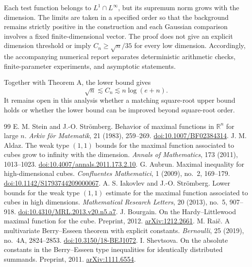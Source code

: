\documentclass[a4paper,11pt]{article}
\theoremstyle{remark}
\begin{document}
Each test function belongs to $L^1\cap L^\infty$, but its supremum norm grows with the dimension.
The limits are taken in a specified order so that the background remains strictly positive in the construction
and each Gaussian comparison involves a fixed finite-dimensional vector. The proof does not give an explicit dimension threshold or imply
$C_n\ge\sqrt n/35$ for every low dimension. Accordingly, the accompanying numerical report separates deterministic arithmetic checks, finite-parameter experiments, and
asymptotic statements.

Together with Theorem A, the lower bound gives
\[
 \sqrt n\lesssim C_n\lesssim n\log(e+n).
\]
It remains open in this analysis whether a matching square-root upper bound holds or whether the lower bound can be improved beyond square-root order.

\begin{thebibliography}{99}
 E. M. Stein and J.-O. Strömberg.
Behavior of maximal functions in $\mathbb R^n$ for large $n$.
\emph{Arkiv för Matematik}, 21 (1983), 259--269.
\href{https://doi.org/10.1007/BF02384314}{doi:10.1007/BF02384314}.
 J. M. Aldaz.
The weak type $(1,1)$ bounds for the maximal function associated to cubes grow to infinity with the dimension.
\emph{Annals of Mathematics}, 173 (2011), 1013--1023.
\href{https://doi.org/10.4007/annals.2011.173.2.10}{doi:10.4007/annals.2011.173.2.10}.
 G. Aubrun.
Maximal inequality for high-dimensional cubes.
\emph{Confluentes Mathematici}, 1 (2009), no.~2, 169--179.
\href{https://doi.org/10.1142/S1793744209000067}{doi:10.1142/S1793744209000067}.
 A. S. Iakovlev and J.-O. Strömberg.
Lower bounds for the weak type $(1,1)$ estimate for the maximal function associated to cubes in high dimensions.
\emph{Mathematical Research Letters}, 20 (2013), no.~5, 907--918.
\href{https://doi.org/10.4310/MRL.2013.v20.n5.a7}{doi:10.4310/MRL.2013.v20.n5.a7}.
 J. Bourgain.
On the Hardy--Littlewood maximal function for the cube.
Preprint, 2012. \href{https://arxiv.org/abs/1212.2661}{arXiv:1212.2661}.
 M. Raič.
A multivariate Berry--Esseen theorem with explicit constants.
\emph{Bernoulli}, 25 (2019), no.~4A, 2824--2853.
\href{https://doi.org/10.3150/18-BEJ1072}{doi:10.3150/18-BEJ1072}.
 I. Shevtsova.
On the absolute constants in the Berry--Esseen type inequalities for identically distributed summands.
Preprint, 2011. \href{https://arxiv.org/abs/1111.6554}{arXiv:1111.6554}.
\end{thebibliography}
\end{document}
